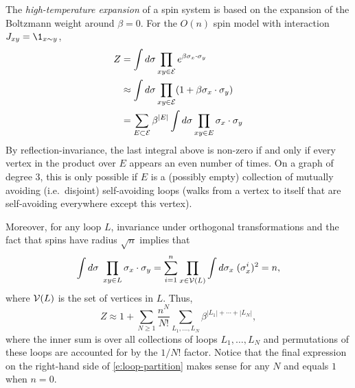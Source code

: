 The \emph{high-temperature expansion} of a spin system is based on the expansion of the
Boltzmann weight  around $\beta = 0$.
For the $O(n)$ spin model with interaction $J_{xy} = \1_{x\sim y}$,
\begin{align}
Z 
	&=
\int d\sigma \prod_{xy\in\mathcal{E}} e^{\beta \sigma_x \cdot \sigma_y} \nonumber \\
	&\approx
\int d\sigma \prod_{xy\in\mathcal{E}} (1 + \beta \sigma_x \cdot \sigma_y) \nonumber \\
	&=
\sum_{E \subset \mathcal{E}} \beta^{|E|} \int d\sigma \prod_{xy \in E} \sigma_x \cdot \sigma_y
\end{align}
By reflection-invariance, the last integral above is non-zero
if and only if every vertex in the product over $E$ appears an even number of times.
On a graph of degree $3$, this is only possible if $E$ is a (possibly empty) collection
of mutually avoiding (i.e.\ disjoint) self-avoiding loops (walks from a vertex to itself
that are self-avoiding everywhere except this vertex).

Moreover, for any loop $L$, invariance under orthogonal transformations and the fact
that spins have radius $\sqrt n$ implies that
\begin{equation}
\int d\sigma \; \prod_{xy\in L} \sigma_x \cdot \sigma_y
	=
\sum_{i=1}^n \prod_{x\in\mathcal{V}(L)} \int d\sigma_x \; (\sigma^i_x)^2
	=
n,
\end{equation}
where $\mathcal{V}(L)$ is the set of vertices in $L$.
Thus,
\begin{equation}
\label{e:loop-partition}
Z
	\approx
1
	+
\sum_{N \ge 1}
\frac{n^N}{N!}
\sum_{L_1,\ldots,L_N}
\beta^{|L_1|+\cdots+|L_N|},
\end{equation}
where the inner sum is over all collections of  loops $L_1, \ldots, L_N$
and permutations of these loops are accounted for by the $1/N!$ factor.
Notice that the final expression on the right-hand side of \eqref{e:loop-partition}
makes sense for any $N$ and equals $1$ when $n = 0$.

